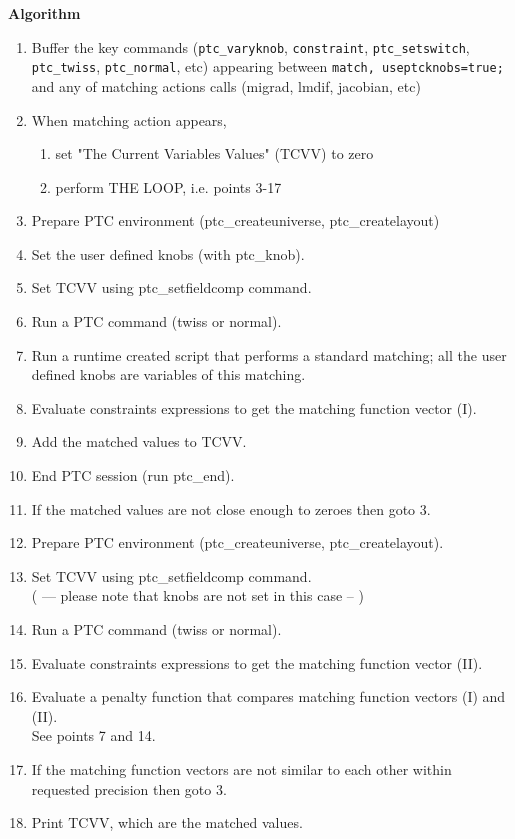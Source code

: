 \textbf{Algorithm}\\
\begin{enumerate}
   \item Buffer the key commands (\texttt{ptc\_varyknob},
     \texttt{constraint}, \texttt{ptc\_setswitch}, \texttt{ptc\_twiss},
     \texttt{ptc\_normal}, etc) appearing between \texttt{match,
       useptcknobs=true;} and any of matching actions calls
     (migrad, lmdif, jacobian, etc)  
   \item  When matching action appears,  
     \begin{enumerate}
       \item set "The Current Variables Values" (TCVV) to zero      
       \item perform THE LOOP, i.e. points 3-17 
     \end{enumerate}
   \item Prepare PTC environment (ptc\_createuniverse,
     ptc\_createlayout)  
   \item Set the user defined knobs (with ptc\_knob).  
   \item Set TCVV using ptc\_setfieldcomp command.  
   \item Run a PTC command (twiss or normal).  
   \item Run a runtime created script that performs a standard matching;
     all the user defined knobs are variables of this matching.  
   \item Evaluate constraints expressions to get the matching function
     vector (I). 
   \item Add the matched values to TCVV. 
   \item End PTC session (run ptc\_end). 
   \item If the matched values are not close enough to zeroes then goto 3.
   \item Prepare PTC environment (ptc\_createuniverse,
     ptc\_createlayout). 
   \item Set TCVV using ptc\_setfieldcomp command.
     \\   ( --- please note that knobs are not set in this case  -- )  
   \item Run a PTC command (twiss or normal).
   \item Evaluate constraints expressions to get the matching function
     vector (II). 
   \item Evaluate a penalty function that compares matching function
     vectors (I) and (II).\\     See points 7 and 14.
   \item If the matching function vectors are not similar to each other
     within requested precision then goto 3. 
   \item Print TCVV, which are the matched values. 
\end{enumerate}


